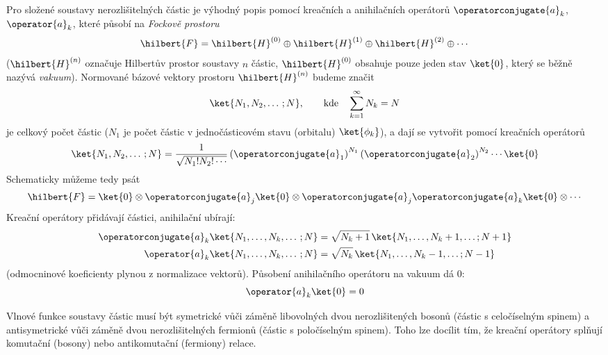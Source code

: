 Pro složené	soustavy nerozlišitelných částic je výhodný popis pomocí kreačních 
a anihilačních operátorů $\operatorconjugate{a}_{k}$, $\operator{a}_{k}$, které působí na \emph{Fockově prostoru}
\begin{equation}
    \hilbert{F}
        =\hilbert{H}^{(0)}\oplus\hilbert{H}^{(1)}\oplus\hilbert{H}^{(2)}\oplus\dotsb
\end{equation}
($\hilbert{H}^{(n)}$ označuje Hilbertův prostor soustavy $n$ částic, 
$\hilbert{H}^{(0)}$ obsahuje pouze jeden stav $\ket{0}$, který se běžně nazývá \emph{vakuum}).
Normované bázové vektory prostoru $\hilbert{H}^{(n)}$ budeme značit
\begin{equation}
    \ket{N_{1},N_{2},\dotsc;N},
        \qquad\text{kde}\quad\sum_{k=1}^{\infty}N_{k}=N
\end{equation}
je celkový počet částic ($N_{1}$ je počet částic v jednočásticovém stavu (orbitalu) $\ket{\phi_{k}}$),
a dají se vytvořit pomocí kreačních operátorů
\begin{equation}
    \ket{N_{1},N_{2},\dotsc;N}
        =\frac{1}{\sqrt{N_{1}!N_{2}!\dotsm}}\left(\operatorconjugate{a}_{1}\right)^{N_{1}}\left(\operatorconjugate{a}_{2}\right)^{N_{2}}\dotsm\ket{0}
\end{equation}	
Schematicky můžeme tedy psát
\begin{equation}
    \hilbert{F}
        =\ket{0}\otimes\operatorconjugate{a}_{j}\ket{0}\otimes\operatorconjugate{a}_{j}\operatorconjugate{a}_{k}\ket{0}\otimes\dotsb
\end{equation}	
Kreační operátory přidávají částici, anihilační ubírají:
\begin{subequations}
    \begin{align}
        \operatorconjugate{a}_{k}\ket{N_{1},\dotsc,N_{k},\dotsc;N}
            &=\sqrt{N_{k}+1}\,\ket{N_{1},\dotsc,N_{k}+1,\dots;N+1}\\
        \operator{a}_{k}\ket{N_{1},\dotsc,N_{k},\dotsc;N}
            &=\sqrt{N_{k}}\,\ket{N_{1},\dotsc,N_{k}-1,\dots;N-1}
    \end{align}        
\end{subequations}
(odmocninové koeficienty plynou z normalizace vektorů).
Působení anihilačního operátoru na vakuum dá $0$:
\begin{equation}
    \operator{a}_{k}\ket{0}=0
\end{equation}

Vlnové funkce soustavy částic musí být symetrické vůči záměně libovolných dvou nerozlišitených bosonů
(částic s celočíselným spinem) a antisymetrické vůči záměně dvou nerozlišitelných fermionů
(částic s poločíselným spinem).
Toho lze docílit tím, že kreační operátory splňují komutační (bosony) nebo antikomutační (fermiony) relace.

